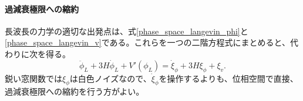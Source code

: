 \documentclass[a4paper,11pt,oneside]{article}
\theoremstyle{definition}
\numberwithin{equation}{section}
\begin{document}
\paragraph{過減衰極限への縮約}



長波長の力学の適切な出発点は、式\eqref{phase_space_langevin_phi}と\eqref{phase_space_langevin_v}である。これらを一つの二階方程式にまとめると、代わりに次を得る。
\begin{equation}
\ddot\phi_{L}
+
3H\dot\phi_{L}
+
V'(\phi_{L})
=
\dot\xi_{\phi}
+
3H\xi_{\phi}
+
\xi_{v}.
\label{secondorderlangevin}
\end{equation}
鋭い窓関数では\(\xi_{\phi}\)は白色ノイズなので、\(\dot\xi_{\phi}\)を操作するよりも、位相空間で直接、過減衰極限への縮約を行う方がよい。
\end{document}
